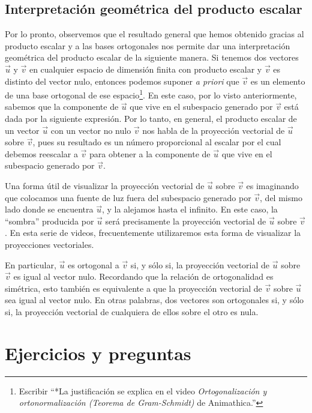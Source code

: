 \documentclass[12pt,dvipsnames]{article}
\numberwithin{equation}{section}
\begin{document}
\subsection{Interpretación geométrica del producto escalar} %

Por lo pronto, observemos que el resultado general que hemos obtenido gracias al producto escalar y a las bases ortogonales nos permite dar una interpretación geométrica del producto escalar de la siguiente manera. Si tenemos dos vectores $\vec{u}$ y $\vec{v}$ en cualquier espacio de dimensión finita con producto escalar y $\vec{v}$ es distinto del vector nulo, entonces podemos suponer \emph{a priori} que $\vec{v}$ es un elemento de una base ortogonal de ese espacio\footnote{Escribir ``*La justificación se explica en el video \emph{Ortogonalización y ortonormalización (Teorema de Gram-Schmidt)} de Animathica.''}. En este caso, por lo visto anteriormente, sabemos que la componente de $\vec{u}$ que vive en el subespacio generado por $\vec{v}$ está dada por la siguiente expresión. Por lo tanto, en general, el producto escalar de un vector $\vec{u}$ con un vector no nulo $\vec{v}$ nos habla de la proyección vectorial de $\vec{u}$ sobre $\vec{v}$, pues su resultado es un número proporcional al escalar por el cual debemos reescalar a $\vec{v}$ para obtener a la componente de $\vec{u}$ que vive en el subespacio generado por $\vec{v}$. 

Una forma útil de visualizar la proyección vectorial de $\vec{u}$ sobre $\vec{v}$ es imaginando que colocamos una fuente de luz fuera del subespacio generado por $\vec{v}$, del mismo lado donde se encuentra $\vec{u}$, y la alejamos hasta el infinito. En este caso, la ``sombra'' producida por $\vec{u}$ será precisamente la proyección vectorial de $\vec{u}$ sobre $\vec{v}$. En esta serie de videos, frecuentemente utilizaremos esta forma de visualizar la proyecciones vectoriales.

En particular, $\vec{u}$ es ortogonal a $\vec{v}$ si, y sólo si, la proyección vectorial de $\vec{u}$ sobre $\vec{v}$ es igual al vector nulo. Recordando que la relación de ortogonalidad es simétrica, esto también es equivalente a que la proyección vectorial de $\vec{v}$ sobre $\vec{u}$ sea igual al vector nulo. En otras palabras, dos vectores son ortogonales si, y sólo si, la proyección vectorial de cualquiera de ellos sobre el otro es nula.


\section{Ejercicios y preguntas}
\end{document}
